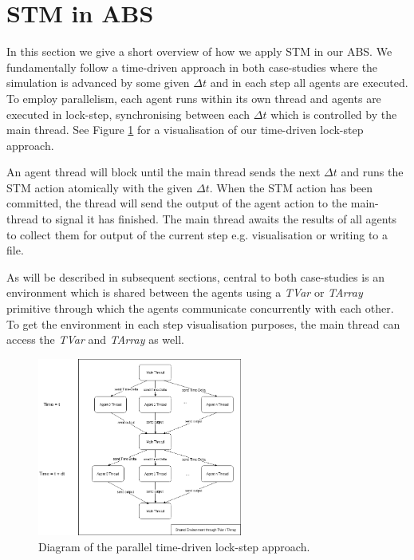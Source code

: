 \section{STM in ABS}
\label{sec:stm_abs}
In this section we give a short overview of how we apply STM in our ABS. We fundamentally follow a time-driven approach in both case-studies where the simulation is advanced by some given $\Delta t$ and in each step all agents are executed. To employ parallelism, each agent runs within its own thread and agents are executed in lock-step, synchronising between each $\Delta t$ which is controlled by the main thread. See Figure \ref{fig:stm_abs_structure} for a visualisation of our time-driven lock-step approach.

An agent thread will block until the main thread sends the next $\Delta t$ and runs the STM action atomically with the given $\Delta t$. When the STM action has been committed, the thread will send the output of the agent action to the main-thread to signal it has finished. The main thread awaits the results of all agents to collect them for output of the current step e.g. visualisation or writing to a file.

As will be described in subsequent sections, central to both case-studies is an environment which is shared between the agents using a \textit{TVar} or \textit{TArray} primitive through which the agents communicate concurrently with each other. To get the environment in each step visualisation purposes, the main thread can access the \textit{TVar} and \textit{TArray} as well. 

\begin{figure}
	\centering
	\includegraphics[width=0.6\textwidth, angle=0]{./fig/dia/stm_abs.png}
	\caption{Diagram of the parallel time-driven lock-step approach.}
	\label{fig:stm_abs_structure}
\end{figure}
